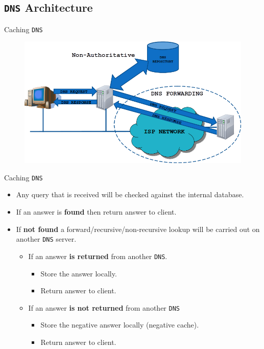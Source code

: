 \documentclass[aspectratio=169]{beamer}
\begin{document}
\subsection{\texttt{DNS} Architecture}
\begin{frame}{Caching \texttt{DNS}}
  \begin{figure}
    \begin{center}
      \includegraphics[width=.8\linewidth]{cachingdns.png}
    \end{center}
  \end{figure}
\end{frame}

\begin{frame}{Caching \texttt{DNS}}
  \begin{itemize}
    \item Any query that is received will be checked against the internal database.
    \item If an answer is \textbf{found} then return answer to client.
    \item If \textbf{not found} a forward/recursive/non-recursive lookup will be carried out on another \texttt{DNS} server.
      \begin{itemize}
        \item If an answer \textbf{is returned} from another \texttt{DNS}.
          \begin{itemize}
            \item Store the answer locally.
            \item Return answer to client.
          \end{itemize}
        \item If an answer \textbf{is not returned} from another \texttt{DNS}
        \begin{itemize}
          \item Store the negative answer locally (negative cache).
          \item Return answer to client.
        \end{itemize}
      \end{itemize}
  \end{itemize} 
\end{frame}
\end{document}
